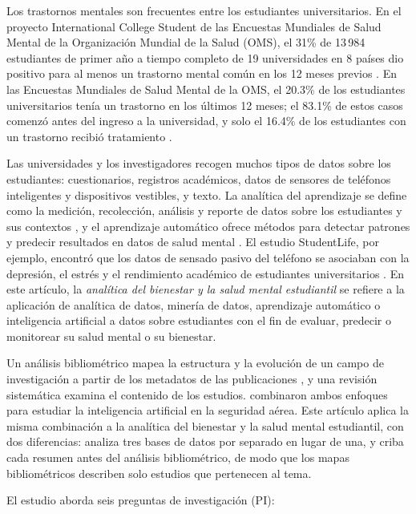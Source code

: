 \documentclass[11pt,a4paper]{article}
\begin{document}
Los trastornos mentales son frecuentes entre los estudiantes universitarios. En el proyecto International College Student de las Encuestas Mundiales de Salud Mental de la Organización Mundial de la Salud (OMS), el 31\% de 13\,984 estudiantes de primer año a tiempo completo de 19 universidades en 8 países dio positivo para al menos un trastorno mental común en los 12 meses previos \cite{auerbach2018wmhicsp}. En las Encuestas Mundiales de Salud Mental de la OMS, el 20.3\% de los estudiantes universitarios tenía un trastorno en los últimos 12 meses; el 83.1\% de estos casos comenzó antes del ingreso a la universidad, y solo el 16.4\% de los estudiantes con un trastorno recibió tratamiento \cite{auerbach2016college}.

Las universidades y los investigadores recogen muchos tipos de datos sobre los estudiantes: cuestionarios, registros académicos, datos de sensores de teléfonos inteligentes y dispositivos vestibles, y texto. La analítica del aprendizaje se define como la medición, recolección, análisis y reporte de datos sobre los estudiantes y sus contextos \cite{siemens2011analytics}, y el aprendizaje automático ofrece métodos para detectar patrones y predecir resultados en datos de salud mental \cite{shatte2019mlmh}. El estudio StudentLife, por ejemplo, encontró que los datos de sensado pasivo del teléfono se asociaban con la depresión, el estrés y el rendimiento académico de estudiantes universitarios \cite{wang2014studentlife}. En este artículo, la \emph{analítica del bienestar y la salud mental estudiantil} se refiere a la aplicación de analítica de datos, minería de datos, aprendizaje automático o inteligencia artificial a datos sobre estudiantes con el fin de evaluar, predecir o monitorear su salud mental o su bienestar.

Un análisis bibliométrico mapea la estructura y la evolución de un campo de investigación a partir de los metadatos de las publicaciones \cite{donthu2021bibliometric,zupic2015bibliometric}, y una revisión sistemática examina el contenido de los estudios. \citet{demir2024aviation} combinaron ambos enfoques para estudiar la inteligencia artificial en la seguridad aérea. Este artículo aplica la misma combinación a la analítica del bienestar y la salud mental estudiantil, con dos diferencias: analiza tres bases de datos por separado en lugar de una, y criba cada resumen antes del análisis bibliométrico, de modo que los mapas bibliométricos describen solo estudios que pertenecen al tema.

El estudio aborda seis preguntas de investigación (PI):
\end{document}

